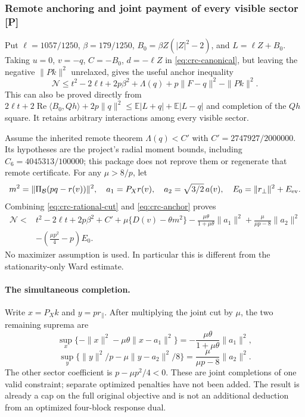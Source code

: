 \subsubsection{Remote anchoring and joint payment of every visible sector [P]}
Put $\ell=1057/1250$, $\beta=179/1250$,
$B_0=\beta Z(|Z|^2-2)$, and $L=\ell Z+B_0$.
Taking $u=0$, $v=-q$, $C=-B_0$, $d=-\ell Z$ in
\eqref{eq:crc-canonical}, but leaving the negative $\|Pk\|^2$ unrelaxed,
gives the useful anchor inequality
\begin{equation}\label{eq:crc-anchor}
 \boxed{\mathcal N\le t^2-2\ell t+2p\beta^2+\Lambda(q)
                  +p\|F-q\|^2-\|Pk\|^2.}
\end{equation}
This can also be proved directly from
$2\ell t+2\operatorname{Re}\langle B_0,Qh\rangle+2p\|q\|^2
\le\mathbb E|L+q|+\mathbb E|L-q|$ and completion of the $Qh$ square.
It retains arbitrary interactions among every visible sector.

Assume the inherited remote theorem $\Lambda(q)<C'$ with
$C'=2747927/2000000$. Its hypotheses are the project's radial moment
bounds, including $C_6=4045313/100000$; this package does not reprove them
or regenerate that remote certificate. For any $\mu>8/p$, let
\[
 m^2=\|\Pi_{\mathcal B}(pq-r(v))\|^2,\quad
 a_1=P_Xr(v),\quad a_2=\sqrt{3/2}\,a(v),\quad
 E_0=\|r_\perp\|^2+E_{\rm ev}.
\]
Combining \eqref{eq:crc-rational-cut} and \eqref{eq:crc-anchor} proves
\begin{equation}\label{eq:crc-transfer}
\boxed{\begin{aligned}
\mathcal N <{}& t^2-2\ell t+2p\beta^2+C'
 +\mu\{D(v)-\theta m^2\}
 -\frac{\mu\theta}{1+\mu\theta}\|a_1\|^2
 +\frac{\mu}{\mu p-8}\|a_2\|^2\\
 &-\left(\frac{\mu p^2}{4}-p\right)E_0 .
\end{aligned}}
\end{equation}
No maximizer assumption is used. In particular this is different from
the stationarity-only Ward estimate.

\paragraph{The simultaneous completion.}
Write $x=P_Xk$ and $y=p r_\parallel$. After multiplying the joint cut by
$\mu$, the two remaining suprema are
\[
 \sup_x\{-\|x\|^2-\mu\theta\|x-a_1\|^2\}
       =-\frac{\mu\theta}{1+\mu\theta}\|a_1\|^2,
\]
\[
 \sup_y\{\|y\|^2/p-\mu\|y-a_2\|^2/8\}
       =\frac{\mu}{\mu p-8}\|a_2\|^2.
\]
The other sector coefficient is $p-\mu p^2/4<0$.
These are joint completions of one valid constraint; separate optimized
penalties have not been added. The result is already a cap on the full
original objective and is not an additional deduction from an optimized
four-block response dual.

